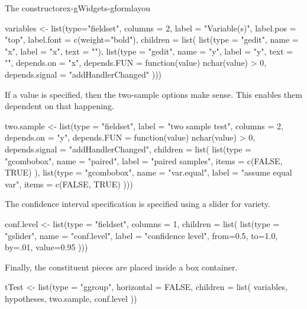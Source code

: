 \begin{example}{The  constructor}{ex-gWidgets-gformlayou}
\begin{Schunk}
\begin{Sinput}
 variables <- 
   list(type="fieldset",
        columns = 2,
        label = "Variable(s)",
        label.pos = "top",
        label.font = c(weight="bold"),
        children = list(
          list(type = "gedit",
               name = "x", label = "x",
               text = ""),
          list(type = "gedit",
               name = "y", label = "y",
               text = "",
               depends.on = "x",
               depends.FUN = function(value) nchar(value) > 0,
               depends.signal = "addHandlerChanged"
               )))
\end{Sinput}
\end{Schunk}

If a  value is specified, then the two-sample options make sense. This enables them dependent on that happening.

\begin{Schunk}
\begin{Sinput}
 two.sample <-  
   list(type = "fieldset",
        label = "two sample test",
        columns = 2,
        depends.on = "y",
        depends.FUN = function(value) nchar(value) > 0,
        depends.signal = "addHandlerChanged",                     
        children = list(
          list(type = "gcombobox",
               name = "paired", label = "paired samples",
               items = c(FALSE, TRUE)
               ),
          list(type = "gcombobox",
               name = "var.equal", label = "assume equal var",
               items = c(FALSE, TRUE)
               )))
\end{Sinput}
\end{Schunk}

The confidence interval specification is specified using a slider for variety.

\begin{Schunk}
\begin{Sinput}
 conf.level <- 
   list(type = "fieldset",
        columns = 1,
        children = list(
          list(type = "gslider",
               name = "conf.level", label = "confidence level",
               from=0.5, to=1.0, by=.01, value=0.95
               )))
\end{Sinput}
\end{Schunk}
Finally, the constituent pieces are placed inside a box container.
\begin{Schunk}
\begin{Sinput}
 tTest <- list(type = "ggroup",
               horizontal = FALSE,
               children = list(
                 variables,
                 hypotheses,
                 two.sample,
                 conf.level
                 ))
\end{Sinput}
\end{Schunk}


\end{example}
